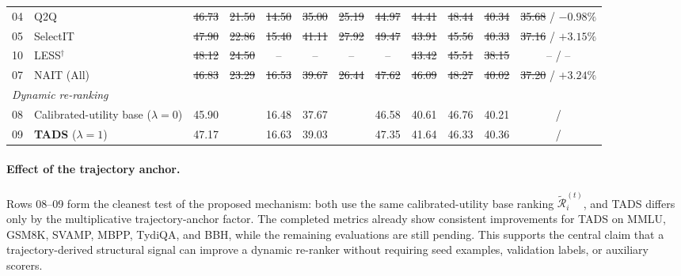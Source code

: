 \begin{table}[t]
\begin{tabular}{llcccccccccc}
04 & Q2Q
& \sout{46.73} & \sout{21.50} & \sout{14.50} & \sout{35.00}
& \sout{25.19} & \sout{44.97} & \sout{44.41} & \sout{48.44}
& \sout{40.34} & \sout{35.68} / \sout{$-0.98\%$} \\

05 & SelectIT
& \sout{47.90} & \sout{22.86} & \sout{15.40} & \sout{41.11}
& \sout{27.92} & \sout{49.47} & \sout{43.91} & \sout{45.56}
& \sout{40.33} & \sout{37.16} / \sout{$+3.15\%$} \\

10 & LESS$^{\dagger}$
& \sout{48.12} & \sout{24.50} & -- & --
& -- & -- & \sout{43.42} & \sout{45.51}
& \sout{38.15} & -- / -- \\

07 & NAIT (All)
& \sout{46.83} & \sout{23.29} & \sout{16.53} & \sout{39.67}
& \sout{26.44} & \sout{47.62} & \sout{46.09} & \sout{48.27}
& \sout{40.02} & \sout{37.20} / \sout{$+3.24\%$} \\

\midrule
\midrule
\multicolumn{12}{l}{\textit{Dynamic re-ranking}}\\
08 & Calibrated-utility base ($\lambda=0$)
& 45.90 & \STATUS{??.??} & 16.48 & 37.67
& \STATUS{??.??} & 46.58 & 40.61 & 46.76
& 40.21 & \STATUS{??.??} / \STATUS{?} \\

09 & \textbf{TADS} ($\lambda=1$)
& 47.17 & \STATUS{??.??} & 16.63 & 39.03
& \STATUS{??.??} & 47.35 & 41.64 & 46.33
& 40.36 & \STATUS{??.??} / \STATUS{?} \\

\bottomrule
\end{tabular}
\end{table}

\paragraph{Effect of the trajectory anchor.}
Rows 08--09 form the cleanest test of the proposed mechanism: both
use the same calibrated-utility base ranking
$\tilde{\mathcal{R}}_i^{(t)}$, and \textsc{TADS} differs only by
the multiplicative trajectory-anchor factor. The completed metrics
already show consistent improvements for \textsc{TADS} on MMLU,
GSM8K, SVAMP, MBPP, TydiQA, and BBH, while the remaining
evaluations are still pending. This supports the central claim
that a trajectory-derived structural signal can improve a dynamic
re-ranker without requiring seed examples, validation labels, or
auxiliary scorers.

